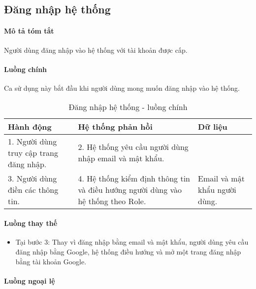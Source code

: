 \documentclass[./../main.tex]{subfiles}
\begin{document}
\subsection{Đăng nhập hệ thống}

\paragraph*{Mô tả tóm tắt}

Người dùng đăng nhập vào hệ thống với tài khoản được cấp.

\paragraph*{Luồng chính} Ca sử dụng này bắt đầu khi người dùng mong muốn đăng
nhập vào hệ thống.

\begin{table}[H]
	\caption{Đăng nhập hệ thống - luồng chính}
	\label{tab:login_flow_main}
	\begin{tabularx}{\textwidth}{|X|X|X|}
		\hline
		\textbf{Hành động}                      & \textbf{Hệ thống phản hồi}                                                       & \textbf{Dữ liệu}              \\ \hline
		1. Người dùng truy cập trang đăng nhập. & 2. Hệ thống yêu cầu người dùng nhập email và mật khẩu.                           &                               \\ \hline
		3. Người dùng điền các thông tin.       & 4. Hệ thống kiểm định thông tin và điều hướng người dùng vào hệ thống theo Role. & Email và mật khẩu người dùng. \\ \hline
	\end{tabularx}
\end{table}

\paragraph*{Luồng thay thế}

\begin{itemize}
	\item
	      Tại bước 3: Thay vì đăng nhập bằng email và mật khẩu, người dùng yêu
	      cầu đăng nhập bằng Google, hệ thống điều hướng và mở một trang đăng
	      nhập bằng tài khoản Google.
\end{itemize}

\paragraph*{Luồng ngoại lệ}
\end{document}
